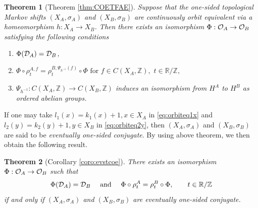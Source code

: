 \documentclass[11pt]{article}
\newtheorem{theorem}{Theorem}[section]
\theoremstyle{plain}
\theoremstyle{definition}
\numberwithin{equation}{section}
\renewcommand{\labelenumi}{\textup{(\theenumi)}}
\newcommand{\RZ}{\mathbb{R}/{\mathbb{Z}}}
\newcommand{\Z}{\mathbb{Z}}
\begin{document}
\begin{theorem}[{Theorem \ref{thm:COETFAE}}]
Suppose that the one-sided topological Markov shifts
$(X_A, \sigma_A)$ and $(X_B,\sigma_B)$
are continuously orbit equivalent via a homeomorphism 
$h:X_A\rightarrow X_B$.
Then there exists an isomorphism
$\Phi:{{\mathcal{O}}_A} \rightarrow {{\mathcal{O}}_B}$ satisfying the following conditions
\begin{enumerate}
\renewcommand{\theenumi}{\roman{enumi}}
\renewcommand{\labelenumi}{\textup{(\theenumi)}}
\item
$\Phi({{\mathcal{D}}_A}) = {{\mathcal{D}}_B}$,
\item
$
\Phi \circ \rho^{A,f}_t = \rho^{B,\Psi_{h^{-1}}(f)}_t \circ \Phi
\text{ for }
f \in C(X_A,\Z), \,\, 
 t \in \RZ,
$
\item 
$\Psi_{h^{-1}}:C(X_A,\Z) \rightarrow C(X_B,\Z)$ 
induces 
an isomorphism from  
$H^A$
to  $H^B$
as ordered abelian groups.
\end{enumerate}
\end{theorem}
If one may take 
$l_1(x) = k_1(x) +1, x \in X_A$
in \eqref{eq:orbiteq1x}
and
$l_2(y) = k_2(y) +1, y \in X_B$
in \eqref{eq:orbiteq2y},
then 
$(X_A,\sigma_A)$ and $(X_B,\sigma_B)$
are said to be {\it eventually one-sided conjugate\/}.
By using above theorem, we then obtain the following result.
\begin{theorem}[{Corollary \ref{coro:evstcoe}}]
There exists an isomorphism
$\Phi:{{\mathcal{O}}_A} \rightarrow {{\mathcal{O}}_B}$ 
such that 
\begin{equation*}
\Phi(\DA) = \DB
\quad 
\text{  and }
\quad
\Phi \circ \rho^A_t = \rho^B_t \circ \Phi, 
\qquad t \in {\RZ}
\end{equation*}
if and only if 
$(X_A, \sigma_A)$ and $(X_B,\sigma_B)$
are eventually one-sided conjugate.
\end{theorem}
\end{document}
